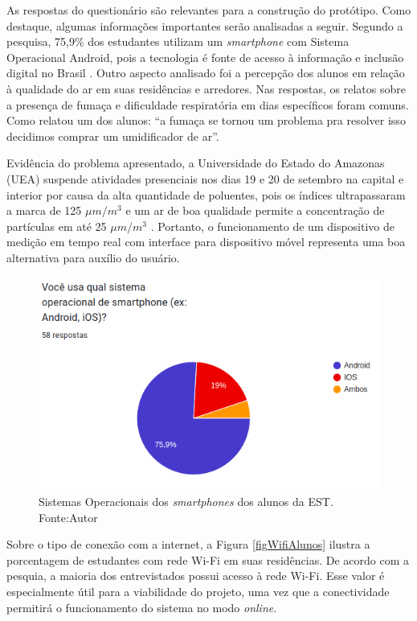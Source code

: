 As respostas do questionário são relevantes para a construção do protótipo. Como destaque, algumas informações importantes serão analisadas a seguir. Segundo a pesquisa, 
75,9\% dos estudantes utilizam um \textit{smartphone} com 
Sistema Operacional Android, pois a tecnologia é fonte de acesso à informação e inclusão digital no Brasil \cite{impacto-android-brasil}. Outro aspecto analisado foi 
a percepção dos alunos em relação à qualidade do ar em suas residências e arredores. Nas respostas, os relatos sobre a presença de fumaça e dificuldade respiratória em dias específicos foram comuns. Como relatou um dos alunos: ``a fumaça se tornou um problema pra resolver isso decidimos comprar um umidificador de ar''. 

Evidência do problema apresentado, a Universidade do Estado do Amazonas (UEA) suspende atividades presenciais nos dias 19 e 20 de setembro na capital e interior por causa 
da alta quantidade de poluentes, pois os índices ultrapassaram a marca de 125 $\mu m/m^{3}$ e um ar de boa qualidade permite a concentração de partículas em  até 25 $\mu m/m^{3}$ \cite{uea-queima-fecha}. Portanto, 
o funcionamento de um dispositivo de medição em tempo real com interface para dispositivo móvel representa uma boa alternativa para auxílio do usuário.

\begin{figure}[ht]
    \centering
    \includegraphics[width=.67\textwidth]{img/graf1-SO-smartphone.png}
    \caption{Sistemas Operacionais dos \textit{smartphones} dos alunos da EST. Fonte:Autor}\label{figSOsmartphone}
\end{figure}

Sobre o tipo de conexão com a internet, a Figura \ref{figWifiAlunos} ilustra a porcentagem de estudantes com rede Wi-Fi em suas residências. De acordo com a pesquia,  
a maioria dos entrevistados possui acesso à rede Wi-Fi. Esse valor é especialmente útil para a viabilidade do projeto, uma vez que a conectividade permitirá o funcionamento do sistema no modo \textit{online}.

